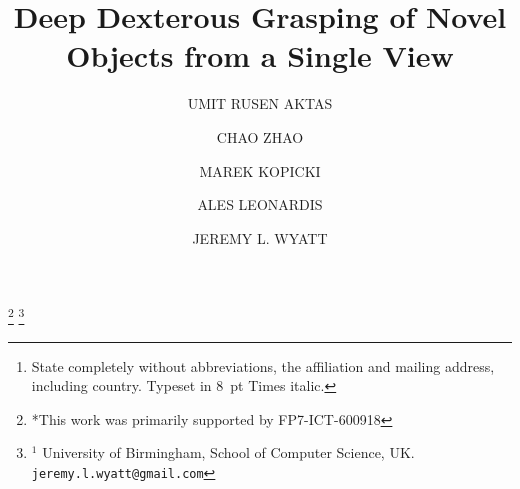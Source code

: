 \documentclass{ws-ijhr}
\begin{document}

%
\catchline{}{}{}{}{}
%

\title{Deep Dexterous Grasping of Novel Objects from a Single View}

\author{UMIT RUSEN AKTAS}

\address{University Department, University Name, Address\\
City, State ZIP/Zone,
Country\footnote{State completely without abbreviations, the
affiliation and mailing address, including country. Typeset in 8~pt
Times italic.}\\
rusenaktas@gmail.com}

\author{CHAO ZHAO}

\address{Group, Laboratory, Address\\
City, State ZIP/Zone, Country\\
second\_author@group.com}

\author{MAREK KOPICKI}

\address{Group, Laboratory, Address\\
City, State ZIP/Zone, Country\\
second\_author@group.com}

\author{ALES LEONARDIS}

\address{Group, Laboratory, Address\\
City, State ZIP/Zone, Country\\
second\_author@group.com}

\author{JEREMY L. WYATT}

\address{Group, Laboratory, Address\\
City, State ZIP/Zone, Country\\
second\_author@group.com}

\thanks{*This work was primarily supported by FP7-ICT-600918}%
\thanks{$^{1}$ University of Birmingham, School of Computer Science, UK.
        {\tt\small jeremy.l.wyatt@gmail.com}}%

\maketitle

\begin{history}
\end{history}
\end{document}
